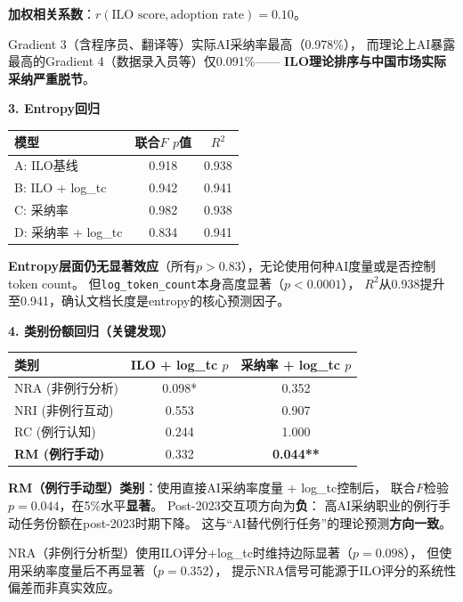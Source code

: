 \documentclass[12pt,a4paper]{ctexart}
\begin{document}
\begin{resultbox}[策略八结果]
\textbf{加权相关系数}：$r(\text{ILO score}, \text{adoption rate}) = 0.10$。

Gradient 3（含程序员、翻译等）实际AI采纳率最高（0.978\%），
而理论上AI暴露最高的Gradient 4（数据录入员等）仅0.091\%——
\textbf{ILO理论排序与中国市场实际采纳严重脱节}。

\medskip
\textbf{3. Entropy回归}

\begin{center}
\small
\begin{tabular}{lcc}
\toprule
模型 & 联合$F$ $p$值 & $R^2$ \\
\midrule
A: ILO基线 & 0.918 & 0.938 \\
B: ILO + log\_tc & 0.942 & 0.941 \\
C: 采纳率 & 0.982 & 0.938 \\
D: 采纳率 + log\_tc & 0.834 & 0.941 \\
\bottomrule
\end{tabular}
\end{center}

\textbf{Entropy层面仍无显著效应}（所有$p > 0.83$），无论使用何种AI度量或是否控制token count。
但\texttt{log\_token\_count}本身高度显著（$p < 0.0001$），
$R^2$从0.938提升至0.941，确认文档长度是entropy的核心预测因子。

\medskip
\textbf{4. 类别份额回归（关键发现）}

\begin{center}
\small
\begin{tabular}{lcc}
\toprule
类别 & ILO + log\_tc $p$ & 采纳率 + log\_tc $p$ \\
\midrule
NRA (非例行分析) & 0.098* & 0.352 \\
NRI (非例行互动) & 0.553 & 0.907 \\
RC (例行认知) & 0.244 & 1.000 \\
\textbf{RM (例行手动)} & 0.332 & \textbf{0.044**} \\
\bottomrule
\end{tabular}
\end{center}

\textbf{RM（例行手动型）类别}：使用直接AI采纳率度量 + log\_tc控制后，
联合$F$检验$p = 0.044$，在5\%水平\textbf{显著}。
Post-2023交互项方向为\textbf{负}：
高AI采纳职业的例行手动任务份额在post-2023时期下降。
这与``AI替代例行任务''的理论预测\textbf{方向一致}。

NRA（非例行分析型）使用ILO评分+log\_tc时维持边际显著（$p=0.098$），
但使用采纳率度量后不再显著（$p=0.352$），
提示NRA信号可能源于ILO评分的系统性偏差而非真实效应。

\end{resultbox}
\end{document}
